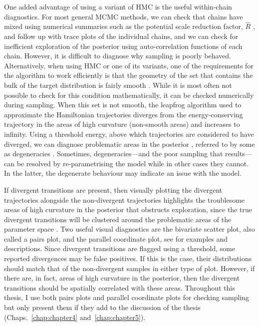 One added advantage of using a variant of HMC is the useful within-chain diagnostics. For most general MCMC methods, we can check that chains have mixed using numerical summaries such as the potential scale reduction factor, $\hat{R}$ \citep{Gelman1992}, and follow up with trace plots of the individual chains, and we can check for inefficient exploration of the posterior using auto-correlation functions of each chain. However, it is difficult to diagnose why sampling is poorly behaved. Alternatively, when using HMC or one of its variants, one of the requirements for the algorithm to work efficiently is that the geometry of the set that contains the bulk of the target distribution is fairly smooth \citep{gabry_vis_2019}. While it is most often not possible to check for this condition mathematically, it can be checked numerically during sampling. When this set is not smooth, the leapfrog algorithm used to approximate the Hamiltonian trajectories diverges from the energy-conserving trajectory in the areas of high curvature (non-smooth areas) and increases to infinity. Using a threshold energy, above which trajectories are considered to have diverged, we can diagnose problematic areas in the posterior \citep{gabry_vis_2019}, referred to by some as degeneracies \citep{betancourt_2020}. Sometimes, degeneracies---and the poor sampling that results---can be resolved by re-parametrising the model \citep{betancourt2015} while in other cases they cannot. In the latter, the degenerate behaviour may indicate an issue with the model.

If divergent transitions are present, then visually plotting the divergent trajectories alongside the non-divergent trajectories highlights the troublesome areas of high curvature in the posterior that obstructs exploration, since the true divergent transitions will be clustered around the problematic areas of the parameter space \citep{gabry_vis_2019}. Two useful visual diagnostics are the bivariate scatter plot, also called a pairs plot, and the parallel coordinate plot, see \citep{gabry_vis_2019} for examples and descriptions. Since divergent transitions are flagged using a threshold, some reported divergences may be false positives. If this is the case, their distributions should match that of the non-divergent samples in either type of plot. However, if there are, in fact, areas of high curvature in the posterior, then the divergent transitions should be spatially correlated with these areas. Throughout this thesis, I use both pairs plots and parallel coordinate plots for checking sampling but only present them if they add to the discussion of the thesis (Chaps.~\ref{chap:chapter4} and~\ref{chap:chapter5}).

